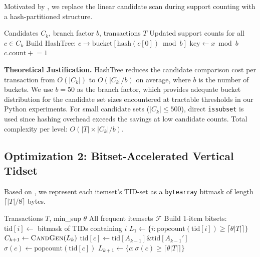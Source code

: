 \documentclass[conference]{IEEEtran}
\begin{document}
Motivated by \cite{park1995}, we replace the linear candidate scan during
support counting with a hash-partitioned structure.

\begin{algorithm}[H]
\caption{Apriori with HashTree}
\begin{algorithmic}[1]
\Require Candidates $C_k$, branch factor $b$, transactions $T$
\Ensure Updated support counts for all $c \in C_k$
\State Build HashTree: $c \rightarrow \text{bucket}[\text{hash}(c[0]) \bmod b]$
    \State $\text{key} \leftarrow x \bmod b$
      \State $c.\text{count} \mathrel{+}= 1$
    \EndFor
  \EndFor
\EndFor
\end{algorithmic}
\end{algorithm}

\noindent\textbf{Theoretical Justification.}
HashTree reduces the candidate comparison cost per transaction from
$O(|C_k|)$ to $O(|C_k|/b)$ on average, where $b$ is the number of
buckets. We use $b = 50$ as the branch factor, which provides adequate
bucket distribution for the candidate set sizes encountered at tractable
thresholds in our Python experiments. For small candidate sets
($|C_k| \leq 500$), direct \texttt{issubset} is used since hashing
overhead exceeds the savings at low candidate counts.
Total complexity per level: $O(|T| \times |C_k|/b)$.

\subsection{Optimization 2: Bitset-Accelerated Vertical Tidset}
\label{sec:opt2}

Based on \cite{zaki1997}, we represent each itemset's TID-set as a
\texttt{bytearray} bitmask of length $\lceil|T|/8\rceil$ bytes.

\begin{algorithm}[H]
\caption{Apriori with Bitset Tidset}
\begin{algorithmic}[1]
\Require Transactions $T$, min\_sup $\theta$
\Ensure All frequent itemsets $\mathcal{F}$
\State Build 1-item bitsets: $\text{tid}[i] \leftarrow$ bitmask of TIDs containing $i$
\State $L_1 \leftarrow \{i : \text{popcount}(\text{tid}[i]) \geq \lceil\theta|T|\rceil\}$
  \State $C_{k+1} \leftarrow \textsc{CandGen}(L_k)$
    \State $\text{tid}[c] \leftarrow \text{tid}[A_{k-1}] \mathbin{\&} \text{tid}[A_{k-1}']$
    \State $\sigma(c) \leftarrow \text{popcount}(\text{tid}[c])$
  \EndFor
  \State $L_{k+1} \leftarrow \{c : \sigma(c) \geq \lceil\theta|T|\rceil\}$
\EndWhile
\end{algorithmic}
\end{algorithm}
\end{document}
